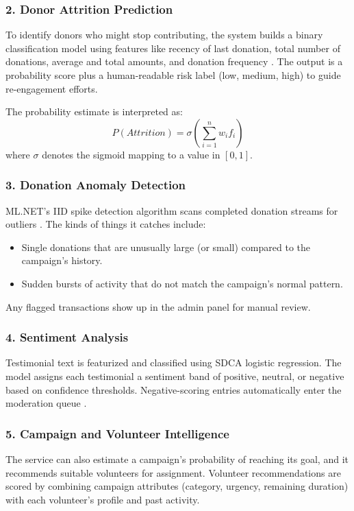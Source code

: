 \documentclass{thesis-library}
\begin{document}
\subsubsection{2. Donor Attrition Prediction}
To identify donors who might stop contributing, the system builds a binary classification model using features like recency of last donation, total number of donations, average and total amounts, and donation frequency \cite{gupta2020donor}. The output is a probability score plus a human-readable risk label (low, medium, high) to guide re-engagement efforts.

The probability estimate is interpreted as:
\begin{equation}
    P(Attrition) = \sigma\!\left(\sum_{i=1}^{n} w_i f_i\right)
\end{equation}
where $\sigma$ denotes the sigmoid mapping to a value in $[0,1]$.

\subsubsection{3. Donation Anomaly Detection}
ML.NET's IID spike detection algorithm scans completed donation streams for outliers \cite{ahmed2021anomaly}. The kinds of things it catches include:
\begin{itemize}
    \item Single donations that are unusually large (or small) compared to the campaign's history.
    \item Sudden bursts of activity that do not match the campaign's normal pattern.
\end{itemize}
Any flagged transactions show up in the admin panel for manual review.

\subsubsection{4. Sentiment Analysis}
Testimonial text is featurized and classified using SDCA logistic regression. The model assigns each testimonial a sentiment band of positive, neutral, or negative based on confidence thresholds. Negative-scoring entries automatically enter the moderation queue \cite{hutto2014vader}.

\subsubsection{5. Campaign and Volunteer Intelligence}
The service can also estimate a campaign's probability of reaching its goal, and it recommends suitable volunteers for assignment. Volunteer recommendations are scored by combining campaign attributes (category, urgency, remaining duration) with each volunteer's profile and past activity.
\end{document}
